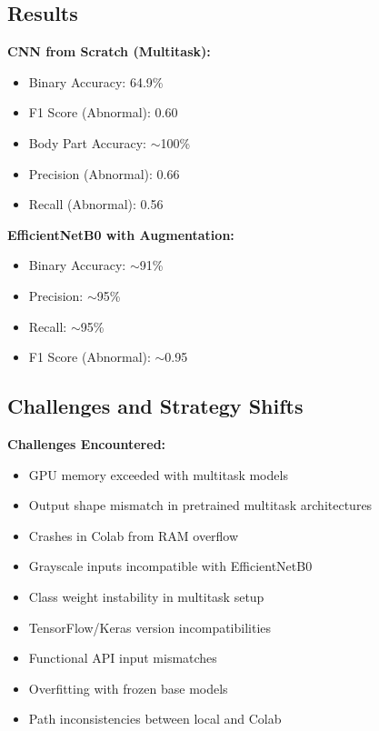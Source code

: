 \documentclass[11pt]{article}
\begin{document}
\subsection*{Results}

\textbf{CNN from Scratch (Multitask):}
\begin{itemize}
    \item Binary Accuracy: 64.9\%
    \item F1 Score (Abnormal): 0.60
    \item Body Part Accuracy: $\sim$100\%
    \item Precision (Abnormal): 0.66
    \item Recall (Abnormal): 0.56
\end{itemize}

\textbf{EfficientNetB0 with Augmentation:}
\begin{itemize}
    \item Binary Accuracy: $\sim$91\%
    \item Precision: $\sim$95\%
    \item Recall: $\sim$95\%
    \item F1 Score (Abnormal): $\sim$0.95
\end{itemize}

\subsection*{Challenges and Strategy Shifts}

\textbf{Challenges Encountered:}
\begin{itemize}
    \item GPU memory exceeded with multitask models
    \item Output shape mismatch in pretrained multitask architectures
    \item Crashes in Colab from RAM overflow
    \item Grayscale inputs incompatible with EfficientNetB0
    \item Class weight instability in multitask setup
    \item TensorFlow/Keras version incompatibilities
    \item Functional API input mismatches
    \item Overfitting with frozen base models
    \item Path inconsistencies between local and Colab
\end{itemize}
\end{document}
